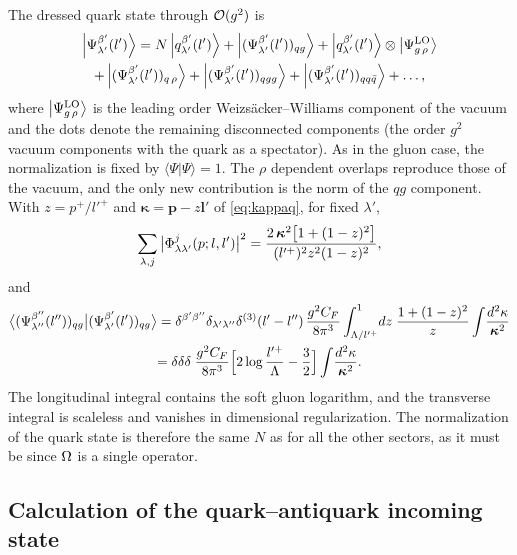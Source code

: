 The dressed quark state through $\mathcal{O}(g^{2})$ is
\begin{multline}
\left|\Psi^{\beta'}_{\lambda'}(l')\right\rangle=N\left|q^{\beta'}_{\lambda'}(l')\right\rangle
+\left|(\Psi^{\beta'}_{\lambda'}(l'))_{qg}\right\rangle+\left|q^{\beta'}_{\lambda'}(l')\right\rangle\otimes\left|\Psi^{\rm LO}_{g\,\rho}\right\rangle\\
+\left|(\Psi^{\beta'}_{\lambda'}(l'))_{q\,\rho}\right\rangle+\left|(\Psi^{\beta'}_{\lambda'}(l'))_{qgg}\right\rangle
+\left|(\Psi^{\beta'}_{\lambda'}(l'))_{qq\bar q}\right\rangle+\dots,
\label{eq:sum-q}
\end{multline}
where $\left|\Psi^{\rm LO}_{g\,\rho}\right\rangle$ is the leading order Weizs\"acker--Williams component of the
vacuum and the dots denote the remaining disconnected components (the order $g^{2}$ vacuum
components with the quark as a spectator). As in the gluon case, the normalization is fixed by
$\langle\Psi|\Psi\rangle=1$. The $\rho$ dependent overlaps reproduce those of the vacuum, and the
only new contribution is the norm of the $qg$ component. With $z=p^{+}/l'^{+}$ and
$\bm\kappa=\bm p-z\bm l'$ of \eqref{eq:kappaq}, for fixed $\lambda'$,
\begin{equation}
\sum_{\lambda,j}\big|\Phi^{j}_{\lambda\lambda'}(p;l,l')\big|^{2}
=\frac{2\,\bm\kappa^{2}\big[1+(1-z)^{2}\big]}{(l'^{+})^{2}z^{2}(1-z)^{2}},
\end{equation}
and
\begin{multline}
\big\langle(\Psi^{\beta''}_{\lambda''}(l''))_{qg}\big|(\Psi^{\beta'}_{\lambda'}(l'))_{qg}\big\rangle
=\delta^{\beta'\beta''}\delta_{\lambda'\lambda''}\delta^{(3)}(l'-l'')\,\frac{g^{2}C_{F}}{8\pi^{3}}
\int_{\Lambda/l'^{+}}^{1}\!dz\;\frac{1+(1-z)^{2}}{z}\int\!\frac{d^{2}\kappa}{\bm\kappa^{2}}\\
=\delta\delta\delta\;\frac{g^{2}C_{F}}{8\pi^{3}}\Big[2\log\frac{l'^{+}}{\Lambda}-\frac32\Big]\int\!\frac{d^{2}\kappa}{\bm\kappa^{2}} .
\label{eq:qnorm}
\end{multline}
The longitudinal integral contains the soft gluon logarithm, and the transverse integral is
scaleless and vanishes in dimensional regularization. The normalization of the quark state is
therefore the same $N$ as for all the other sectors, as it must be since $\Omega$ is a single
operator.

\subsection{Calculation of the quark--antiquark incoming state}
\label{sec:wf-qq}

